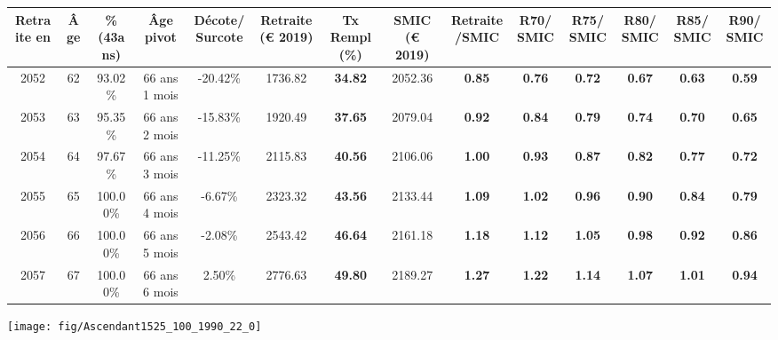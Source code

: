\begin{adjustbox}{max width=\textwidth} 
\begin{tabular}[htb]{|c|c||c|c|c||c|c||c|c||c|c|c|c|c|} 
\hline 
 Retraite en &  Âge &  \%(43ans) &  Âge pivot &  Décote/Surcote &  Retraite (\euro{} 2019) &  Tx Rempl(\%) &  SMIC (\euro{} 2019) &  Retraite/SMIC &  R70/SMIC &  R75/SMIC &  R80/SMIC &  R85/SMIC &  R90/SMIC \\ 
\hline \hline 
 2052 &  62 &  93.02\% &  66 ans 1 mois &  -20.42\% &  1736.82 &  {\bf 34.82} &  2052.36 &  {\bf {\color{red} 0.85}} &  {\bf {\color{red} 0.76}} &  {\bf {\color{red} 0.72}} &  {\bf {\color{red} 0.67}} &  {\bf {\color{red} 0.63}} &  {\bf {\color{red} 0.59}} \\ 
\hline 
 2053 &  63 &  95.35\% &  66 ans 2 mois &  -15.83\% &  1920.49 &  {\bf 37.65} &  2079.04 &  {\bf {\color{red} 0.92}} &  {\bf {\color{red} 0.84}} &  {\bf {\color{red} 0.79}} &  {\bf {\color{red} 0.74}} &  {\bf {\color{red} 0.70}} &  {\bf {\color{red} 0.65}} \\ 
\hline 
 2054 &  64 &  97.67\% &  66 ans 3 mois &  -11.25\% &  2115.83 &  {\bf 40.56} &  2106.06 &  {\bf 1.00} &  {\bf {\color{red} 0.93}} &  {\bf {\color{red} 0.87}} &  {\bf {\color{red} 0.82}} &  {\bf {\color{red} 0.77}} &  {\bf {\color{red} 0.72}} \\ 
\hline 
 2055 &  65 &  100.00\% &  66 ans 4 mois &  -6.67\% &  2323.32 &  {\bf 43.56} &  2133.44 &  {\bf 1.09} &  {\bf 1.02} &  {\bf {\color{red} 0.96}} &  {\bf {\color{red} 0.90}} &  {\bf {\color{red} 0.84}} &  {\bf {\color{red} 0.79}} \\ 
\hline 
 2056 &  66 &  100.00\% &  66 ans 5 mois &  -2.08\% &  2543.42 &  {\bf 46.64} &  2161.18 &  {\bf 1.18} &  {\bf 1.12} &  {\bf 1.05} &  {\bf {\color{red} 0.98}} &  {\bf {\color{red} 0.92}} &  {\bf {\color{red} 0.86}} \\ 
\hline 
 2057 &  67 &  100.00\% &  66 ans 6 mois &  2.50\% &  2776.63 &  {\bf 49.80} &  2189.27 &  {\bf 1.27} &  {\bf 1.22} &  {\bf 1.14} &  {\bf 1.07} &  {\bf 1.01} &  {\bf {\color{red} 0.94}} \\ 
\hline 
\hline 
\end{tabular} 
\end{adjustbox} 
 
 \vspace{0.1cm} 

 {\hspace{-2.2cm}\texttt{[image: fig/Ascendant1525\_100\_1990\_22\_0]}} 

\newpage 
 
